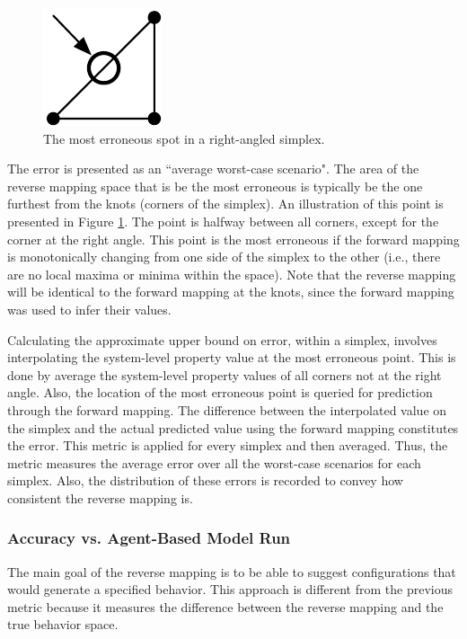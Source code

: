 \begin{figure}[ht]
\centering
\includegraphics[scale=1]{images/mosterror.pdf}
\caption{The most erroneous spot in a right-angled simplex.}
\label{fig:mosterror}
\end{figure}

The error is presented as an ``average worst-case scenario".
The area of the reverse mapping space that is be the most erroneous is typically be the one furthest from the knots (corners of the simplex).
An illustration of this point is presented in Figure \ref{fig:mosterror}.
The point is halfway between all corners, except for the corner at the right angle.
This point is the most erroneous if the forward mapping is monotonically changing from one side of the simplex to the other (i.e., there are no local maxima or minima within the space).
Note that the reverse mapping will be identical to the forward mapping at the knots, since the forward mapping was used to infer their values.

Calculating the approximate upper bound on error, within a simplex, involves interpolating the system-level property value at the most erroneous point.
This is done by average the system-level property values of all corners not at the right angle.
Also, the location of the most erroneous point is queried for prediction through the forward mapping.
The difference between the interpolated value on the simplex and the actual predicted value using the forward mapping constitutes the error.
This metric is applied for every simplex and then averaged.
Thus, the metric measures the average error over all the worst-case scenarios for each simplex.
Also, the distribution of these errors is recorded to convey how consistent the reverse mapping is.


  \subsubsection{Accuracy vs. Agent-Based Model Run}

The main goal of the reverse mapping is to be able to suggest configurations that would generate a specified behavior.
This approach is different from the previous metric because it measures the difference between the reverse mapping and the true behavior space.

